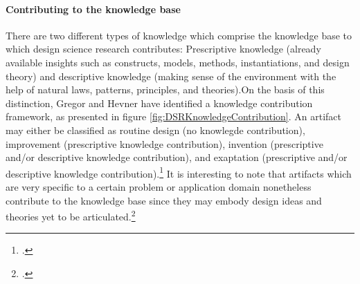\paragraph{Contributing to the knowledge base} There are two different types of knowledge which comprise the knowledge base to which design science research contributes: Prescriptive knowledge (already available insights such as constructs, models, methods, instantiations, and design theory) and descriptive knowledge (making sense of the environment with the help of natural laws, patterns, principles, and theories).On the basis of this distinction, Gregor and Hevner have identified a knowledge contribution framework, as presented in figure \ref{fig:DSRKnowledgeContribution}. An artifact may either be classified as routine design (no knowlegde contribution), improvement (prescriptive knowledge contribution), invention (prescriptive and/or descriptive knowledge contribution), and exaptation (prescriptive and/or descriptive knowledge contribution).\footcite[Cf.][pp.344 et seq]{GregorPositioningpresentingdesign2013} It is interesting to note that artifacts which are very specific to a certain problem or application domain nonetheless contribute to the knowledge base since they may embody design ideas and theories yet to be articulated.\footcite[Cf.][p.340]{GregorPositioningpresentingdesign2013}

